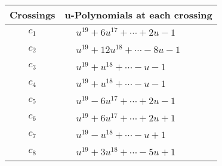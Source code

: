 \documentclass[1p]{elsarticle_modified}
\theoremstyle{definition}
\begin{document}
\begin{tabular}{m{50pt}|m{274pt}}
Crossings & \hspace{64pt}u-Polynomials at each crossing \\
\hline $$\begin{aligned}c_{1}\end{aligned}$$&$\begin{aligned}
&u^{19}+6 u^{17}+\cdots+2 u-1
\end{aligned}$\\
\hline $$\begin{aligned}c_{2}\end{aligned}$$&$\begin{aligned}
&u^{19}+12 u^{18}+\cdots-8 u-1
\end{aligned}$\\
\hline $$\begin{aligned}c_{3}\end{aligned}$$&$\begin{aligned}
&u^{19}+u^{18}+\cdots- u-1
\end{aligned}$\\
\hline $$\begin{aligned}c_{4}\end{aligned}$$&$\begin{aligned}
&u^{19}+u^{18}+\cdots- u-1
\end{aligned}$\\
\hline $$\begin{aligned}c_{5}\end{aligned}$$&$\begin{aligned}
&u^{19}-6 u^{17}+\cdots+2 u-1
\end{aligned}$\\
\hline $$\begin{aligned}c_{6}\end{aligned}$$&$\begin{aligned}
&u^{19}+6 u^{17}+\cdots+2 u+1
\end{aligned}$\\
\hline $$\begin{aligned}c_{7}\end{aligned}$$&$\begin{aligned}
&u^{19}- u^{18}+\cdots- u+1
\end{aligned}$\\
\hline $$\begin{aligned}c_{8}\end{aligned}$$&$\begin{aligned}
&u^{19}+3 u^{18}+\cdots-5 u+1
\end{aligned}$\\

\end{tabular}
\end{document}
